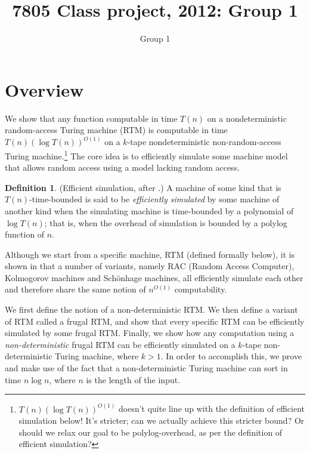 \documentclass[english]{article}
\theoremstyle{plain}
\theoremstyle{definition}
\newtheorem{defn}[thm]{Definition}
\theoremstyle{plain}
\begin{document}
\title{7805 Class project, 2012: Group 1}
\author{Group 1}
\maketitle

\section{Overview}

We show that any function computable in time $T(n)$ on a
nondeterministic random-access Turing machine (RTM) is computable in
time $T(n)(\log T(n))^{O(1)}$ on a $k$-tape nondeterministic
non-random-access Turing machine.\footnote{$T(n)(\log T(n))^{O(1)}$
  doesn't quite line up with the definition of efficient simulation
  below! It's stricter; can we actually achieve this stricter bound?
  Or should we relax our goal to be polylog-overhead, as per the
  definition of efficient simulation?}
The core idea is to efficiently simulate some machine model that
allows random access using a model lacking random access.

\begin{defn}

  (Efficient simulation, after \cite{DBLP:conf/ershov/GurevichS89}.) A
  machine of some kind that is $T(n)$-time-bounded is said to be
  \emph{efficiently simulated} by some machine of another kind when
  the simulating machine is time-bounded by a polynomial of $\log
  T(n)$; that is, when the overhead of simulation is bounded by a
  polylog function of $n$.
\end{defn}

Although we start from a specific machine, RTM (defined formally
below), it is shown in \cite{DBLP:conf/ershov/GurevichS89} that a
number of variants, namely RAC (Random Access Computer), Kolmogorov
machines and Sch\"{o}nhage machines, all efficiently simulate each
other and therefore share the same notion of $n^{O(1)}$ computability.

We first define the notion of a non-deterministic RTM. We then define
a variant of RTM called a frugal RTM, and show that every specific RTM
can be efficiently simulated by some frugal RTM. Finally, we show how
any computation using a \emph{non-deterministic} frugal RTM can be
efficiently simulated on a $k$-tape non-deterministic Turing machine,
where $k>1$. In order to accomplish this, we prove and make use of the
fact that a non-deterministic Turing machine can sort in time $n \log
n$, where $n$ is the length of the input.
\end{document}
